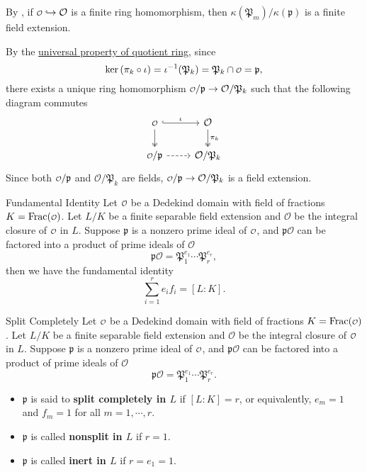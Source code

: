 \begin{remark}
    By , if $\mathcalo\hookrightarrow \mathcal{O}$ is a finite ring homomorphism, then $\kappa(\mathfrak{P}_m)/\kappa(\mathfrak{p})$ is a finite field extension.
\end{remark}
\begin{prf}
    By the \hyperref[th:universal_property_of_quotient_ring]{universal property of quotient ring}, since 
    \[
    \ker \left( \pi_k\circ \iota\right)=\iota^{-1}(\mathfrak{P}_k)=\mathfrak{P}_k \cap \mathcalo=\mathfrak{p},
    \]
    there exists a unique ring homomorphism $\mathcalo/\mathfrak{p}\to \mathcal{O}/\mathfrak{P}_k$ such that the following diagram commutes
    \[
        \begin{tikzcd}
            \mathcalo \arrow[r, "\iota", hook] \arrow[d, two heads] & \mathcal{O} \arrow[d, "\pi_k", two heads] \\
            \mathcalo/\mathfrak{p} \arrow[r, dashed]                & \mathcal{O}/\mathfrak{P}_k               
            \end{tikzcd}
    \]
    Since both $\mathcalo/\mathfrak{p}$ and $\mathcal{O}/\mathfrak{P}_k$ are fields, $\mathcalo/\mathfrak{p}\to \mathcal{O}/\mathfrak{P}_k$ is a field extension. 
\end{prf}


\begin{proposition}{Fundamental Identity}{}
    Let $\mathcalo$ be a Dedekind domain with field of fractions $K=\mathrm{Frac}(\mathcalo)$. Let $L/K$ be a finite separable field extension and $\mathcal{O}$ be the integral closure of $\mathcalo$ in $L$. Suppose $\mathfrak{p}$ is a nonzero prime ideal of $\mathcalo$, and $\mathfrak{p}\mathcal{O}$ can be factored into a product of prime ideals of $\mathcal{O}$ 
    \[
    \mathfrak{p}\mathcal{O}=\mathfrak{P}_1^{e_1}\cdots\mathfrak{P}_r^{e_r},
    \]
    then we have the fundamental identity
    \[
    \sum_{i=1}^r e_i f_i=[L:K].
    \]
 
\end{proposition}
\begin{definition}{Split Completely}{}
    Let $\mathcalo$ be a Dedekind domain with field of fractions $K=\mathrm{Frac}(\mathcalo)$. Let $L/K$ be a finite separable field extension and $\mathcal{O}$ be the integral closure of $\mathcalo$ in $L$. Suppose $\mathfrak{p}$ is a nonzero prime ideal of $\mathcalo$, and $\mathfrak{p}\mathcal{O}$ can be factored into a product of prime ideals of $\mathcal{O}$ 
    \[
    \mathfrak{p}\mathcal{O}=\mathfrak{P}_1^{e_1}\cdots\mathfrak{P}_r^{e_r}.
    \]
    \begin{itemize}
        \item $\mathfrak{p}$ is said to \textbf{split completely in $L$} if $[L:K]=r$, or equivalently, $e_m=1$ and $f_m=1$ for all $m = 1,\cdots,r$.
        \item $\mathfrak{p}$ is called \textbf{nonsplit in $L$} if $r=1$.
        \item $\mathfrak{p}$ is called \textbf{inert in $L$} if $r=e_1=1$.
    \end{itemize}
    
\end{definition}


